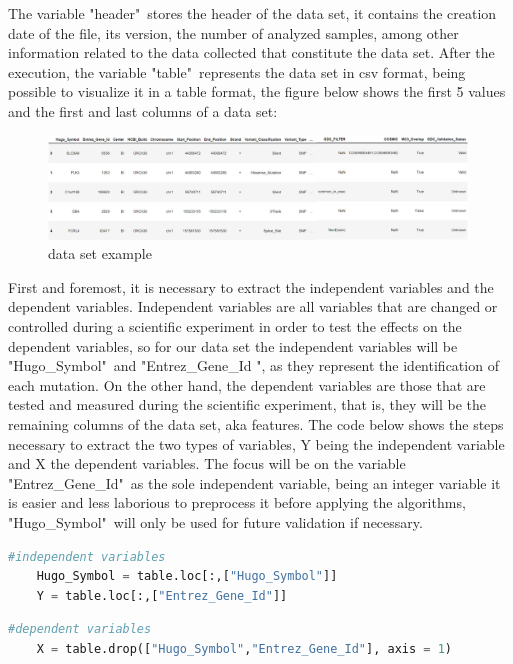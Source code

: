 The variable "header"\ stores the header of the data set, it contains the creation date of the file, its version, the number of analyzed samples, among other information related to the data collected that constitute the data set. After the execution, the variable "table"\ represents the data set in csv format, being possible to visualize it in a table format, the figure below shows the first 5 values and the first and last columns of a data set:

\begin{figure}[h]
    \centering
    \includegraphics[width=0.99\textwidth,height=0.2\textheight]{Chapters/Figures/dataset.jpg}
    \caption{data set example}
    \label{fig:dataset}
\end{figure}

First and foremost, it is necessary to extract the independent variables and the dependent variables. Independent variables are all variables that are changed or controlled during a scientific experiment in order to test the effects on the dependent variables, so for our data set the independent variables will be "Hugo\_Symbol"\ and "Entrez\_Gene\_Id ", as they represent the identification of each mutation. On the other hand, the dependent variables are those that are tested and measured during the scientific experiment, that is, they will be the remaining columns of the data set, aka features. The code below shows the steps necessary to extract the two types of variables, Y being the independent variable and X the dependent variables. The focus will be on the variable "Entrez\_Gene\_Id"\ as the sole independent variable, being an integer variable it is easier and less laborious to preprocess it before applying the algorithms, "Hugo\_Symbol"\ will only be used for future validation if necessary.

\begin{lstlisting}[language=Python]
#independent variables 
    Hugo_Symbol = table.loc[:,["Hugo_Symbol"]]
    Y = table.loc[:,["Entrez_Gene_Id"]]
\end{lstlisting}

\begin{lstlisting}[language=Python]
#dependent variables
    X = table.drop(["Hugo_Symbol","Entrez_Gene_Id"], axis = 1)
\end{lstlisting}
